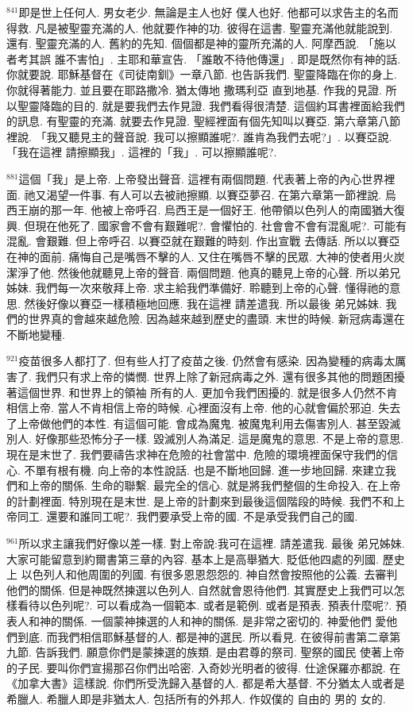 \documentclass{book}
\begin{document}
$^{841}$即是世上任何人.
男女老少.
無論是主人也好 僕人也好.
他都可以求告主的名而得救.
凡是被聖靈充滿的人.
他就要作神的功.
彼得在這書.
聖靈充滿他就能說到.
還有.
聖靈充滿的人.
舊約的先知.
個個都是神的靈所充滿的人.
阿摩西說.
「施以者考其誤 誰不害怕」.
主耶和華宣告.
「誰敢不待他傳還」.
即是既然你有神的話.
你就要說.
耶穌基督在《司徒南釧》一章八節.
也告訴我們.
聖靈降臨在你的身上.
你就得著能力.
並且要在耶路撒冷.
猶太傳地 撒瑪利亞 直到地基.
作我的見證.
所以聖靈降臨的目的.
就是要我們去作見證.
我們看得很清楚.
這個約耳書裡面給我們的訊息.
有聖靈的充滿.
就要去作見證.
聖經裡面有個先知叫以賽亞.
第六章第八節裡說.
「我又聽見主的聲音說.
我可以擦顯誰呢?.
誰肯為我們去呢?」.
以賽亞說.
「我在這裡 請擦顯我」.
這裡的「我」.
可以擦顯誰呢?.

$^{881}$這個「我」是上帝.
上帝發出聲音.
這裡有兩個問題.
代表著上帝的內心世界裡面.
祂又渴望一件事.
有人可以去被祂擦顯.
以賽亞夢召.
在第六章第一節裡說.
烏西王崩的那一年.
他被上帝呼召.
烏西王是一個好王.
他帶領以色列人的南國猶大復興.
但現在他死了.
國家會不會有艱難呢?.
會懼怕的.
社會會不會有混亂呢?.
可能有混亂.
會艱難.
但上帝呼召.
以賽亞就在艱難的時刻.
作出宣戰 去傳話.
所以以賽亞在神的面前.
痛悔自己是嘴唇不擊的人.
又住在嘴唇不擊的民眾.
大神的使者用火炭潔淨了他.
然後他就聽見上帝的聲音.
兩個問題.
他真的聽見上帝的心聲.
所以弟兄姊妹.
我們每一次來敬拜上帝.
求主給我們準備好.
聆聽到上帝的心聲.
懂得祂的意思.
然後好像以賽亞一樣積極地回應.
我在這裡 請差遣我.
所以最後 弟兄姊妹.
我們的世界真的會越來越危險.
因為越來越到歷史的盡頭.
末世的時候.
新冠病毒還在不斷地變種.

$^{921}$疫苗很多人都打了.
但有些人打了疫苗之後.
仍然會有感染.
因為變種的病毒太厲害了.
我們只有求上帝的憐憫.
世界上除了新冠病毒之外.
還有很多其他的問題困擾著這個世界.
和世界上的領袖 所有的人.
更加令我們困擾的.
就是很多人仍然不肯相信上帝.
當人不肯相信上帝的時候.
心裡面沒有上帝.
他的心就會偏於邪迫.
失去了上帝做他們的本性.
有這個可能.
會成為魔鬼.
被魔鬼利用去傷害別人.
甚至毀滅別人.
好像那些恐怖分子一樣.
毀滅別人為滿足.
這是魔鬼的意思.
不是上帝的意思.
現在是末世了.
我們要禱告求神在危險的社會當中.
危險的環境裡面保守我們的信心.
不單有根有機.
向上帝的本性說話.
也是不斷地回歸.
進一步地回歸.
來建立我們和上帝的關係.
生命的聯繫.
最完全的信心.
就是將我們整個的生命投入.
在上帝的計劃裡面.
特別現在是末世.
是上帝的計劃來到最後這個階段的時候.
我們不和上帝同工.
還要和誰同工呢?.
我們要承受上帝的國.
不是承受我們自己的國.

$^{961}$所以求主讓我們好像以差一樣.
對上帝說:我可在這裡.
請差遣我.
最後 弟兄姊妹.
大家可能留意到約爾書第三章的內容.
基本上是高舉猶大.
貶低他四處的列國.
歷史上 以色列人和他周圍的列國.
有很多恩恩怨怨的.
神自然會按照他的公義.
去審判他們的關係.
但是神既然揀選以色列人.
自然就會恩待他們.
其實歷史上我們可以怎樣看待以色列呢?.
可以看成為一個範本.
或者是範例.
或者是預表.
預表什麼呢?.
預表人和神的關係.
一個蒙神揀選的人和神的關係.
是非常之密切的.
神愛他們 愛他們到底.
而我們相信耶穌基督的人.
都是神的選民.
所以看見.
在彼得前書第二章第九節.
告訴我們.
願意你們是蒙揀選的族類.
是由君尊的祭司.
聖祭的國民 使著上帝的子民.
要叫你們宣揚那召你們出哈密.
入奇妙光明者的彼得.
仕途保羅亦都說.
在《加拿大書》這樣說.
你們所受洗歸入基督的人.
都是希大基督.
不分猶太人或者是希臘人.
希臘人即是非猶太人.
包括所有的外邦人.
作奴僕的 自由的 男的 女的.
\end{document}
